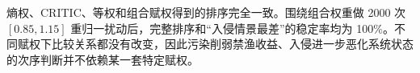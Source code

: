 熵权、CRITIC、等权和组合赋权得到的排序完全一致。围绕组合权重做 2000 次 $[0.85,1.15]$ 重归一扰动后，完整排序和“入侵情景最差”的稳定率均为 100\%。不同赋权下比较关系都没有改变，因此污染削弱禁渔收益、入侵进一步恶化系统状态的次序判断并不依赖某一套特定赋权。
